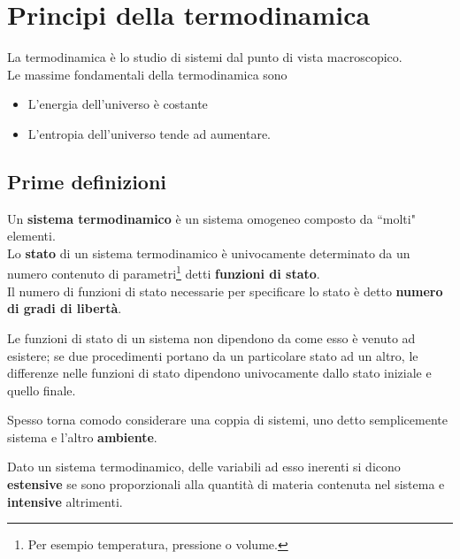 \chapter{Principi della termodinamica}
\noindent
La termodinamica \`e lo studio di sistemi dal punto di vista macroscopico.\\
Le massime fondamentali della termodinamica sono
\begin{itemize}
\item L'energia dell'universo \`e costante
\item L'entropia dell'universo tende ad aumentare.
\end{itemize}

\section{Prime definizioni}
\begin{definition}
Un \textbf{sistema termodinamico} \`e un sistema omogeneo composto da ``molti" elementi.\\
Lo \textbf{stato} di un sistema termodinamico \`e univocamente determinato da un numero contenuto di parametri\footnote{Per esempio temperatura, pressione o volume.} detti \textbf{funzioni di stato}.\\
Il numero di funzioni di stato necessarie per specificare lo stato \`e detto \textbf{numero di gradi di libert\`a}.
\end{definition}

\begin{remark}
Le funzioni di stato di un sistema non dipendono da come esso \`e venuto ad esistere; se due procedimenti portano da un particolare stato ad un altro, le differenze nelle funzioni di stato dipendono univocamente dallo stato iniziale e quello finale.
\end{remark}

\begin{remark}
Spesso torna comodo considerare una coppia di sistemi, uno detto semplicemente sistema e l'altro \textbf{ambiente}.
\end{remark}

\begin{definition}
Dato un sistema termodinamico, delle variabili ad esso inerenti si dicono \textbf{estensive} se sono proporzionali alla quantit\`a di materia contenuta nel sistema e \textbf{intensive} altrimenti.
\end{definition}

